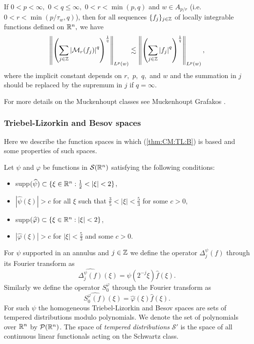 {\begin{theorem}
If $0<p<\infty,$ $0<q\le \infty,$  $0<r <\min(p,q)$ and $w \in A_{p/r}$ (i.e. $0<r<\min(p/\tau_w,q)$), then for all sequences $\{f_{j}\}_{j\in\mathbb{Z}}$ of locally integrable functions defined on ${{\mathbb R}^n},$ we have
 \begin{equation*}
 \left\|\left(\sum_{j\in\mathbb{Z}}\left\vert \mathcal{M}_r (f_j) \right\vert^q\right)^{\frac{1}{q}}\right\|_{L^{p}(w)}\lesssim
 \left\|\left(\sum_{j\in\mathbb{Z}}\left\vert f_j \right\vert^q\right)^{\frac{1}{q}}\right\|_{L^{p}(w)},\label{eq:wFS}
 \end{equation*}
where the implicit constant depends on $r,$ $p,$ $q,$ and $w$ and the summation in $j$ should be replaced by the supremum in $j$ if $q=\infty.$
\end{theorem}
For more details on the Muckenhoupt classes see Muckenhoupt \cite{MR0293384} Grafakos \cite{MR3243741}.

\subsubsection{Triebel-Lizorkin and Besov spaces}\label{TL_B_section}
Here we describe the function spaces in which (\ref{thm:CM:TL:B}) is based and some properties of such spaces. 

Let $\psi$ and $\varphi$ be functions in ${\mathcal{S}}({{\mathbb R}^n})$ satisfying the following conditions:
\begin{itemize}
\item supp$(\widehat{\psi})\subset\{\xi\in{{\mathbb R}^n} : \frac{1}{2} < |\xi| <2\}$,
\item $|\widehat{\psi}(\xi)|>c$ for all $\xi$ such that $\frac{3}{5} < |\xi| < \frac{5}{3}$ for some $c>0$,
\item supp$(\widehat{\varphi}) \subset \{\xi\in{{\mathbb R}^n} : |\xi| < 2\}$,
\item $|\widehat{\varphi}(\xi)|>c$ for $|\xi| < \frac{5}{3}$ and some $c>0$. 
\end{itemize}
For $\psi$ supported in an annulus and $j\in\mathbb{Z}$ we define the operator $\Delta^\psi_j(f)$ through its Fourier transform as \[\widehat{\Delta^\psi_j (f)}(\xi) = \psi(2^{-j}\xi)\widehat{f}(\xi).\]
Similarly we define the operator $S^\varphi_0$ through the Fourier transform as
\[ \widehat{S^\varphi_0 (f)}(\xi) = \widehat{\varphi}(\xi)\widehat{f}(\xi).\]
For such $\psi$ the homogeneous Triebel-Lizorkin and Besov spaces are sets of tempered distributions modulo polynomials. We denote the set of polynomials over ${{\mathbb R}^n}$ by $\mathcal{P}({{\mathbb R}^n})$. The space of \textit{tempered distributions} $\mathcal{S}'$ is the space of all continuous linear functionals acting on the Schwartz class.

}
